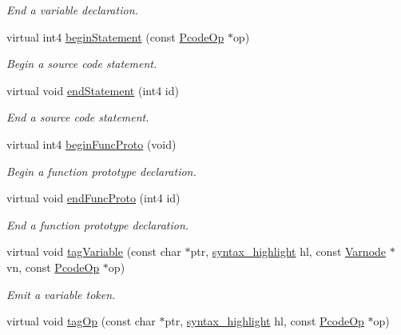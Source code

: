 \begin{DoxyCompactItemize}
\begin{DoxyCompactList}\small\item\em End a variable declaration. \end{DoxyCompactList}\item 
virtual int4 \mbox{\hyperlink{class_emit_xml_a597d30a7231fa323c2bdef9afc8160aa}{begin\+Statement}} (const \mbox{\hyperlink{class_pcode_op}{Pcode\+Op}} $\ast$op)
\begin{DoxyCompactList}\small\item\em Begin a source code statement. \end{DoxyCompactList}\item 
virtual void \mbox{\hyperlink{class_emit_xml_a179b45bd8929a464f8fbc622de96f399}{end\+Statement}} (int4 id)
\begin{DoxyCompactList}\small\item\em End a source code statement. \end{DoxyCompactList}\item 
virtual int4 \mbox{\hyperlink{class_emit_xml_acaf7a29dd1eb427f20e99dccf3581f59}{begin\+Func\+Proto}} (void)
\begin{DoxyCompactList}\small\item\em Begin a function prototype declaration. \end{DoxyCompactList}\item 
virtual void \mbox{\hyperlink{class_emit_xml_a0c1fad40b58e0a977f69ed80fb6f3bc8}{end\+Func\+Proto}} (int4 id)
\begin{DoxyCompactList}\small\item\em End a function prototype declaration. \end{DoxyCompactList}\item 
virtual void \mbox{\hyperlink{class_emit_xml_aeac0d9e1327c3aa1bd2e3fe42e3a1824}{tag\+Variable}} (const char $\ast$ptr, \mbox{\hyperlink{class_emit_xml_a7c3577436da429c3c75f4b82cac6864f}{syntax\+\_\+highlight}} hl, const \mbox{\hyperlink{class_varnode}{Varnode}} $\ast$vn, const \mbox{\hyperlink{class_pcode_op}{Pcode\+Op}} $\ast$op)
\begin{DoxyCompactList}\small\item\em Emit a variable token. \end{DoxyCompactList}\item 
virtual void \mbox{\hyperlink{class_emit_xml_a66f5a32fa62561f08d29e725d20c0596}{tag\+Op}} (const char $\ast$ptr, \mbox{\hyperlink{class_emit_xml_a7c3577436da429c3c75f4b82cac6864f}{syntax\+\_\+highlight}} hl, const \mbox{\hyperlink{class_pcode_op}{Pcode\+Op}} $\ast$op)

\end{DoxyCompactItemize}
